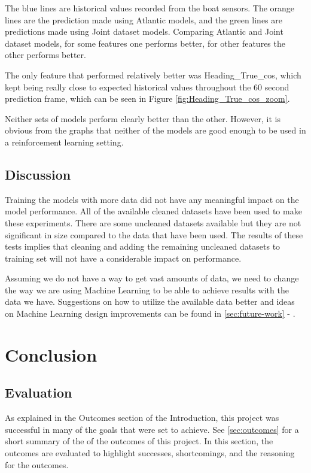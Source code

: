\documentclass[12pt,twoside]{report}
\begin{document}
The blue lines are historical values recorded from the boat sensors. The orange lines are the prediction made using Atlantic models, and the green lines are predictions made using Joint dataset models. Comparing Atlantic and Joint dataset models, for some features one performs better, for other features the other performs better. 

The only feature that performed relatively better was Heading\_True\_cos, which kept being really close to expected historical values throughout the 60 second prediction frame, which can be seen in Figure \ref{fig:Heading_True_cos_zoom}.

Neither sets of models perform clearly better than the other. However, it is obvious from the graphs that neither of the models are good enough to be used in a reinforcement learning setting.


\section{Discussion}
Training the models with more data did not have any meaningful impact on the model performance. All of the available cleaned datasets have been used to make these experiments. There are some uncleaned datasets available but they are not significant in size compared to the data that have been used. The results of these tests implies that cleaning and adding the remaining uncleaned datasets to training set will not have a considerable impact on performance.

Assuming we do not have a way to get vast amounts of data, we need to change the way we are using Machine Learning to be able to achieve results with the data we have. Suggestions on how to utilize the available data better and ideas on Machine Learning design improvements can be found in \ref{sec:future-work} - .


\chapter{Conclusion}

\section{Evaluation}
As explained in the Outcomes section of the Introduction, this project was successful in many of the goals that were set to achieve. See \ref{sec:outcomes} for a short summary of the of the outcomes of this project. In this section, the outcomes are evaluated to highlight successes, shortcomings, and the reasoning for the outcomes.
\end{document}
